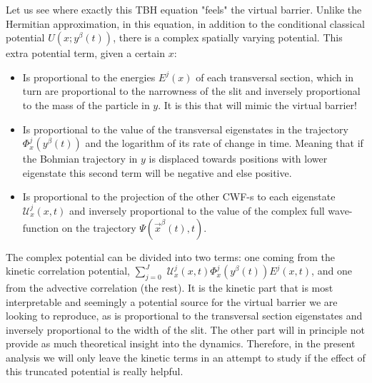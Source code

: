 \documentclass[11pt, a4paper]{article} %
\newcommand{\U}{\mathscr{U}}
\begin{document}
Let us see where exactly this TBH equation "feels" the virtual barrier. Unlike the Hermitian approximation, in this equation, in addition to the conditional classical potential $U(x;y^\beta(t))$, there is a complex spatially varying potential. This extra potential term, given a certain $x$:
\begin{itemize}
\item Is proportional to the energies $E^j(x)$ of each transversal section, which in turn are proportional to the narrowness of the slit and inversely proportional to the mass of the particle in $y$. It is this that will mimic the virtual barrier!
\item Is proportional to the value of the transversal eigenstates in the trajectory $\Phi^j_x(y^\beta(t))$ and the logarithm of its rate of change in time. Meaning that if the Bohmian trajectory in $y$ is displaced towards positions with lower eigenstate this second term will be negative and else positive.
\item Is proportional to the projection of the other CWF-s to each eigenstate $\U^j_x(x,t)$ and inversely proportional to the value of the complex full wave-function on the trajectory $\Psi(\vec{x}^\beta(t),t)$.
\end{itemize}
\vspace{-0.2cm}
The complex potential can be divided into two terms: one coming from the kinetic correlation potential, $\sum_{j=0}^J $ $\U^j_x(x,t)\Phi^j_x(y^\beta(t)) E^j(x,t)$,  and one from the advective correlation (the rest). It is the kinetic part that is most interpretable and seemingly a potential source for the virtual barrier we are looking to reproduce, as is proportional to the transversal section eigenstates and inversely proportional to the width of the slit. The other part will in principle not provide as much theoretical insight into the dynamics. Therefore, in the present analysis we will only leave the kinetic terms in an attempt to study if the effect of this truncated potential is really helpful.

\end{document}
